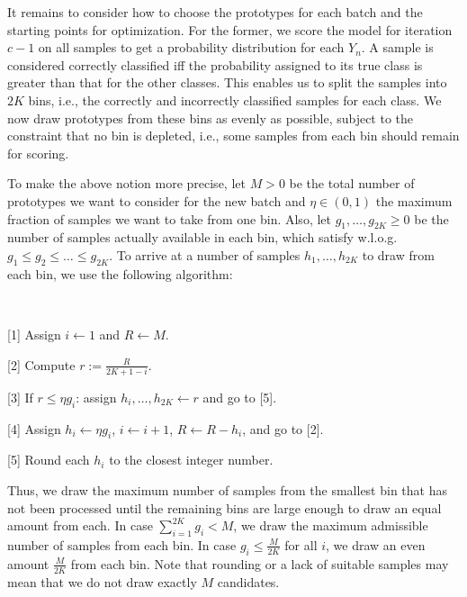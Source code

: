 %
It remains to consider how to choose the prototypes for each batch and the starting points for optimization.
For the former, we score the model for iteration $c-1$ on all samples to get a probability distribution for each $Y_n$.
A sample is considered correctly classified iff the probability assigned to its true class is greater than that for the other classes.
This enables us to split the samples into $2K$ bins, i.e., the correctly and incorrectly classified samples for each class.
We now draw prototypes from these bins as evenly as possible, subject to the constraint that no bin is depleted, i.e., some samples from each bin should remain for scoring.\par
%
To make the above notion more precise, let $M>0$ be the total number of prototypes we want to consider for the new batch and $\eta\in(0,1)$ the  maximum fraction of samples we want to take from one bin.
Also, let $g_1,\dots, g_{2K}\geq0$ be the number of samples actually available in each bin, which satisfy w.l.o.g.\ $g_1\leq g_2\leq\dots\leq g_{2K}$.
To arrive at a number of samples $h_1,\dots,h_{2K}$ to draw from each bin, we use the following algorithm:
%
\begin{samepage}
\begin{algorithm}~
\label{alg_bins}
%
\begin{description}
\item{[1]} Assign $i\leftarrow1$ and $R\leftarrow M$.
%
\item{[2]} Compute $r:=\frac{R}{2K+1-i}$.
%
\item{[3]} If $r\leq\eta g_i$: assign $h_i,\dots,h_{2K}\leftarrow r$ and go to [5].
%
\item{[4]} Assign $h_i\leftarrow\eta g_i$, $i\leftarrow i+1$, $R\leftarrow R-h_i$, and go to [2].
%
\item{[5]} Round each $h_i$ to the closest integer number.
\end{description}
\end{algorithm}
\end{samepage}
%
Thus, we draw the maximum number of samples from the smallest bin that has not been processed until the remaining bins are large enough to draw an equal amount from each.
In case $\sum_{i=1}^{2K}g_i<M$,  we draw the maximum admissible number of samples from each bin.
In case $g_i\leq\frac{M}{2K}$ for all $i$, we draw an even amount $\frac{M}{2K}$ from each bin.
Note that rounding or a lack of suitable samples may mean that we do not draw exactly $M$ candidates.\par
